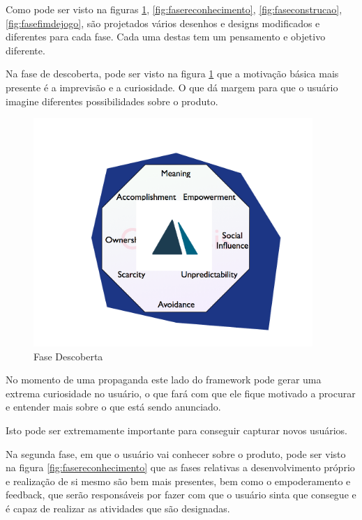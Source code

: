 Como pode ser visto na figuras \ref{fig:fasedescoberta}, \ref{fig:fasereconhecimento}, \ref{fig:faseconstrucao}, 
\ref{fig:fasefimdejogo}, são projetados vários
desenhos e designs modificados e diferentes para cada fase. Cada uma destas
tem um pensamento e objetivo diferente.

Na fase de descoberta, pode ser visto na figura \ref{fig:fasedescoberta} que a motivação básica mais presente é
a imprevisão e a curiosidade. O que dá margem para que o usuário imagine diferentes
possibilidades sobre o produto. 

\begin{figure}[h]
    \centering
    \includegraphics[width=400px, scale=1]{figuras/fasedescoberta}
    \caption{Fase Descoberta}
    \label{fig:fasedescoberta}
\end{figure}

No momento de uma propaganda este lado do framework pode gerar uma
extrema curiosidade no usuário, o que fará com que ele fique motivado a procurar
e entender mais sobre o que está sendo anunciado.

Isto pode ser extremamente importante para conseguir capturar novos usuários.

Na segunda fase, em que o usuário vai conhecer sobre o produto, pode ser visto
na figura \ref{fig:fasereconhecimento} que as fases relativas a desenvolvimento próprio e realização de si mesmo
são bem mais presentes, bem como o empoderamento e feedback, que serão
responsáveis por fazer com que o usuário sinta que consegue e é capaz
de realizar as atividades que são designadas.

